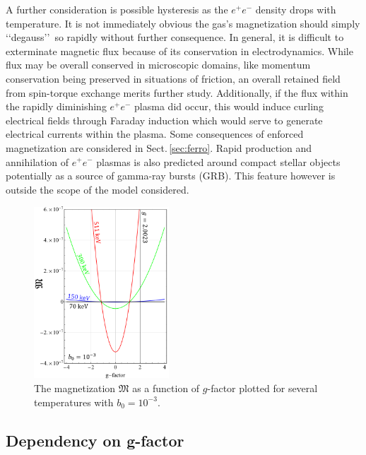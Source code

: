 \documentclass[reprint]{revtex4-2}
\newcommand{\rsec}[1]{Sect.\,{\ref{#1}}}
\begin{document}
A further consideration is possible hysteresis as the $e^{+}e^{-}$ density drops with temperature. It is not immediately obvious the gas's magnetization should simply \lq\lq degauss\rq\rq\ so rapidly without further consequence. In general, it is difficult to exterminate magnetic flux because of its conservation in electrodynamics. While flux may be overall conserved in microscopic domains, like momentum conservation being preserved in situations of friction, an overall retained field from spin-torque exchange merits further study. Additionally, if the flux within the rapidly diminishing $e^{+}e^{-}$ plasma did occur, this would induce curling electrical fields through Faraday induction which would serve to generate electrical currents within the plasma.  Some consequences of enforced magnetization are considered in \rsec{sec:ferro}. Rapid production and annihilation of $e^{+}e^{-}$ plasmas is also predicted around compact stellar objects~\cite{ruffini2009electron,ruffini2012electron} potentially as a source of gamma-ray bursts (GRB). This feature however is outside the scope of the model considered.

\begin{figure}[ht]
    \centering
    \includegraphics[width=0.45\textwidth]{plots/GFactor_04.png}
    \caption{The magnetization $\mathfrak M$ as a function of $g$-factor plotted for several temperatures with $b_{0}=10^{-3}$.}
    \label{fig:gfac} 
\end{figure}

\subsection{Dependency on g-factor}
\label{sec:gfac}
\end{document}
